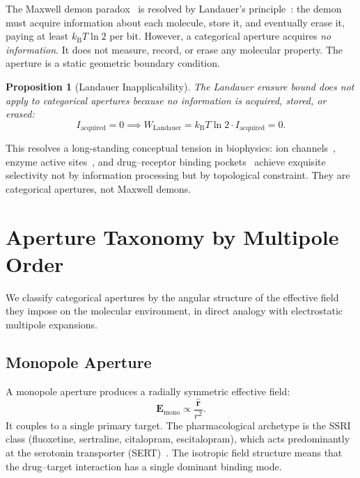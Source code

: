 \documentclass[10pt,twocolumn]{article}
\newtheorem{proposition}[theorem]{Proposition}
\theoremstyle{definition}
\theoremstyle{remark}
\newcommand{\kB}{k_{\mathrm{B}}}
\begin{document}
The Maxwell demon paradox~\cite{Maxwell1871} is resolved by
Landauer's principle~\cite{Landauer1961}: the demon must acquire
information about each molecule, store it, and eventually erase it,
paying at least $\kB T \ln 2$ per bit.  However, a categorical
aperture acquires \emph{no information}.  It does not measure,
record, or erase any molecular property.  The aperture is a
static geometric boundary condition.

\begin{proposition}[Landauer Inapplicability]\label{prop:landauer}
The Landauer erasure bound does not apply to categorical apertures
because no information is acquired, stored, or erased:
\begin{equation}
  I_{\text{acquired}} = 0 \implies
  W_{\text{Landauer}} = \kB T \ln 2 \cdot I_{\text{acquired}} = 0.
\end{equation}
\end{proposition}

This resolves a long-standing conceptual tension in biophysics:
ion channels~\cite{Hille2001}, enzyme active sites~\cite{Wolfenden2001},
and drug--receptor binding pockets~\cite{Kenakin2004} achieve
exquisite selectivity not by information processing but by
topological constraint.  They are categorical apertures, not
Maxwell demons.

\section{Aperture Taxonomy by Multipole Order}\label{sec:taxonomy}

We classify categorical apertures by the angular structure of
the effective field they impose on the molecular environment,
in direct analogy with electrostatic multipole expansions.

\subsection{Monopole Aperture}

A monopole aperture produces a radially symmetric effective field:
\begin{equation}
  \mathbf{E}_{\text{mono}} \propto \frac{\hat{\mathbf{r}}}{r^2}.
\end{equation}
It couples to a single primary target.  The pharmacological
archetype is the SSRI class (fluoxetine, sertraline, citalopram,
escitalopram), which acts predominantly at the serotonin
transporter (SERT)~\cite{Stahl2021,Owens1997}.  The isotropic
field structure means that the drug--target interaction has a
single dominant binding mode.
\end{document}
